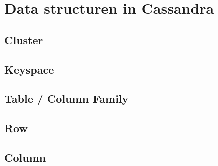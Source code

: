 \chapter{Data structuren in Cassandra}
\label{ch:cassandra_data}


\section{Cluster}
\section{Keyspace}
\section{Table / Column Family}
\section{Row}
\section{Column}